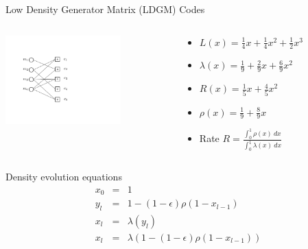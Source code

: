 \documentclass[10pt,xcolor=table]{beamer}
\begin{document}
\begin{frame}{Low Density Generator Matrix (LDGM) Codes}
\vspace{-3mm}
\begin{columns}
\begin{column}{0.47\textwidth}
\begin{center}
\includegraphics[width=1.75in]{./Figures/graphicalmodel}
\end{center}
\end{column}
\begin{column}{0.47\textwidth}
\begin{itemize}
\item $L(x) = \frac14 x + \frac14 x^2 + \frac12 x^3$
\vspace{2mm}
\item $\lambda(x) = \frac19 + \frac29 x + \frac 69 x^2$
\vspace{2mm}
\item $R(x) = \frac15 x + \frac45 x^2$
\vspace{2mm}
\item $\rho(x) = \frac19 + \frac89 x$
\vspace{2mm}
\item Rate $R = \frac{\int_{0}^{1}\rho(x) \ dx}{\int_{0}^{1} \lambda(x) \ dx}$
\end{itemize}
\end{column}
\end{columns}
\begin{block}{Density evolution equations}
\vspace*{-3mm}
\begin{eqnarray*}
  x_0 &=& 1 \\
  y_l &=& 1-(1-\epsilon) \rho(1-x_{l-1}) \\
  x_l &=& \lambda(y_l) \\
  x_l &=& \lambda(1-(1-\epsilon)\rho(1-x_{l-1}))
\end{eqnarray*}
\end{block}
\end{frame}
\end{document}

